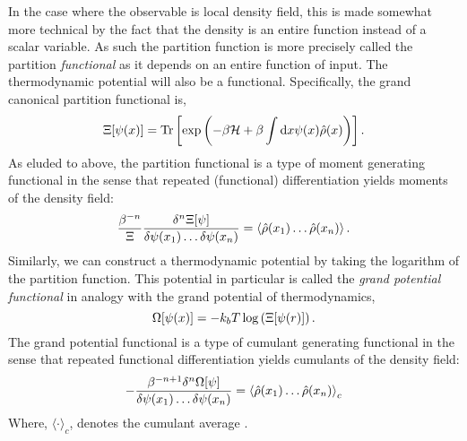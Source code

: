 In the case where the observable is local density field, this is made somewhat
more technical by the fact that the density is an entire function instead of a
scalar variable.  As such the partition function is more precisely called the
partition \textit{functional} as it depends on an entire function of input. The
thermodynamic potential will also be a functional.
Specifically, the grand canonical partition functional is,
%
\begin{equation}
    \Xi[\psi(x)] = \mathrm{Tr}\left[ \exp\left(-\beta\mathcal{H} +\beta\int\mathrm{d}x
        \psi(x) \hat{\rho}(x)\right) \right].
\end{equation}
%
As eluded to above, the partition functional is a type of moment generating
functional in the sense that repeated (functional) differentiation yields
moments of the density field:
%
\begin{equation}
    \frac{\beta^{-n}}{\Xi} \frac{\delta^n \Xi[\psi]}{\delta \psi(x_1) \dots \delta\psi(x_n)} 
        = \left\langle \hat{\rho}(x_1)\dots\hat{\rho}(x_n) \right\rangle.
\end{equation}
%
Similarly, we can construct a thermodynamic potential by taking the logarithm
of the partition function. This potential in particular is called the
\textit{grand potential functional} in analogy with the grand potential of
thermodynamics,
%
\begin{equation}
    \Omega[\psi(x)] = -k_bT\log\left(\Xi[\psi(r)]\right).
\end{equation}
%
The grand potential functional is a type of cumulant generating functional in
the sense that repeated functional differentiation yields cumulants of the
density field:
%
\begin{equation}
    -\frac{\beta^{-n + 1}\delta^n\Omega[\psi]}{\delta\psi(x_1)\dots\delta\psi(x_n)}
        = \left\langle \hat{\rho}(x_1)\dots\hat{\rho}(x_n) \right\rangle_c
\end{equation}
%
Where, $\langle \cdot \rangle_c$, denotes the cumulant average \cite{KUBO62}.

